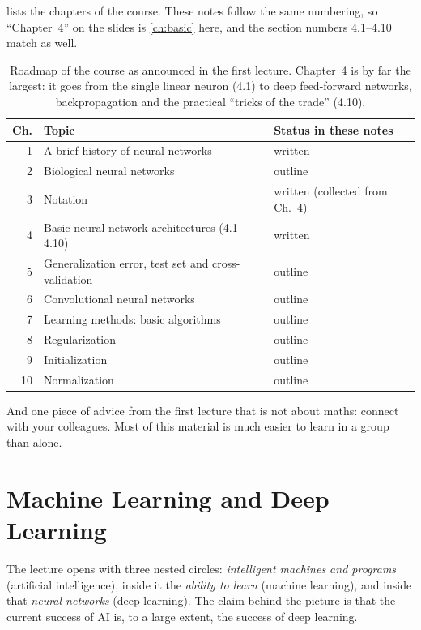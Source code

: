 \documentclass[11pt, oneside]{book}
\let\originalsection\section
\renewcommand{\section}{\Needspace{7\baselineskip}\originalsection}
\begin{document}
 lists the chapters of the course. These notes follow the
same numbering, so ``Chapter~4'' on the slides is \cref{ch:basic} here, and
the section numbers 4.1--4.10 match as well.

\begin{table}[htbp]
\centering
\small
\begin{tabular}{@{}rll@{}}
\toprule
\textbf{Ch.} & \textbf{Topic} & \textbf{Status in these notes} \\
\midrule
1  & A brief history of neural networks          & written \\
2  & Biological neural networks                  & outline \\
3  & Notation                                    & written (collected from Ch.~4) \\
4  & Basic neural network architectures (4.1--4.10) & written \\
5  & Generalization error, test set and cross-validation & outline \\
6  & Convolutional neural networks               & outline \\
7  & Learning methods: basic algorithms          & outline \\
8  & Regularization                              & outline \\
9  & Initialization                              & outline \\
10 & Normalization                               & outline \\
\bottomrule
\end{tabular}
\caption{Roadmap of the course as announced in the first lecture.
Chapter~4 is by far the largest: it goes from the single linear neuron
(4.1) to deep feed-forward networks, backpropagation and the practical
``tricks of the trade'' (4.10).}
\label{tab:roadmap}
\end{table}

And one piece of advice from the first lecture that is not about maths:
connect with your colleagues. Most of this material is much easier to learn
in a group than alone.

\section{Machine Learning and Deep Learning}

The lecture opens with three nested circles: \emph{intelligent machines and
programs} (artificial intelligence), inside it the \emph{ability to learn}
(machine learning), and inside that \emph{neural networks} (deep learning).
The claim behind the picture is that the current success of AI is, to a
large extent, the success of deep learning.
\end{document}
